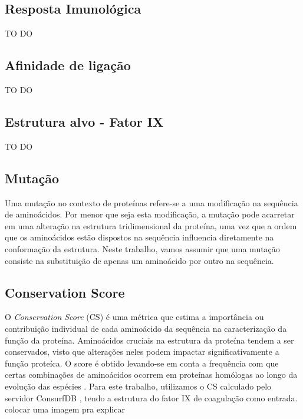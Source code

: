\subsection{Resposta Imunológica}
{\color{red} TO DO}

\subsection{Afinidade de ligação}
{\color{red} TO DO}

\subsection{Estrutura alvo - Fator IX}
{\color{red} TO DO}

\subsection{Mutação}
Uma mutação no contexto de proteínas refere-se a uma modificação na sequência de aminoácidos. Por menor que seja esta modificação, a mutação pode acarretar em uma alteração na estrutura tridimensional da proteína, uma vez que a ordem que os aminoácidos estão dispostos na sequência influencia diretamente na conformação da estrutura. Neste trabalho, vamos assumir que uma mutação consiste na substituição de apenas um aminoácido por outro na sequência. 

\subsection{Conservation Score}
O \textit{Conservation Score} (CS) é uma métrica que estima a importância ou contribuição individual de cada aminoácido da sequência na caracterização da função da proteína. Aminoácidos cruciais na estrutura da proteína tendem a ser conservados, visto que alterações neles podem impactar significativamente a função proteíca. 
O score é obtido levando-se em conta a frequência com que certas combinações de aminoácidos ocorrem em proteínas homólogas ao longo da evolução das espécies \cite{Eddy}. 
Para este trabalho, utilizamos o CS calculado pelo servidor ConsurfDB \cite{ConsurfDB}, tendo a estrutura do fator IX de coagulação como entrada. 
{\color{red} colocar uma imagem pra explicar}


